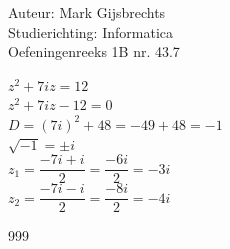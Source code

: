 \documentclass[a4paper]{article}
\begin{document}
\noindent \large Auteur: Mark Gijsbrechts \\
\noindent \large Studierichting: Informatica\\
\noindent \large Oefeningenreeks 1B nr. 43.7\\

\medskip

\normalsize



$z^2 + 7iz = 12$ \\

$z^2 + 7iz - 12 = 0$ \\

$D = (7i)^2 + 48 = -49 + 48 = -1$ \\

$\sqrt{-1} = \pm i$ \\

$z_{1} = \dfrac{-7i + i}{2} = \dfrac{-6i}{2} = -3i$ \\

$z_{2} = \dfrac{-7i - i}{2} = \dfrac{-8i}{2} = -4i$ \\



\begin{thebibliography}{999}
\end{thebibliography}
\end{document}
